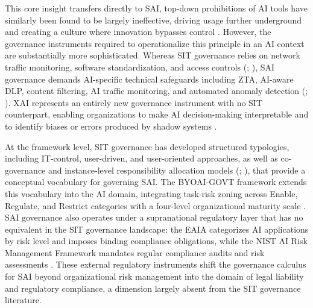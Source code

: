\documentclass[12pt,oneside]{article}
\begin{document}
This core insight transfers directly to \ac{SAI}, top-down prohibitions of \ac{AI} tools have similarly been found to be largely ineffective, driving usage further underground and creating a culture where innovation bypasses control \citep[1136]{raizada2026shadowai}. However, the governance instruments required to operationalize this principle in an \ac{AI} context are substantially more sophisticated. Whereas \ac{SIT} governance relies on network traffic monitoring, software standardization, and access controls (\citealp[278]{silic2014shadow}; \citealp[9]{koch2014consumerization}), \ac{SAI} governance demands \ac{AI}-specific technical safeguards including \ac{ZTA}, \ac{AI}-aware \ac{DLP}, content filtering, \ac{AI} traffic monitoring, and automated anomaly detection (\citealp[973, 974]{puthal2025shadowai}; \citealp[1]{whitford2025aidriven}). \ac{XAI} represents an entirely new governance instrument with no \ac{SIT} counterpart, enabling organizations to make \ac{AI} decision-making interpretable and to identify biases or errors produced by shadow systems \citep[7]{balogun2025ethical}.

At the framework level, \ac{SIT} governance has developed structured typologies, including \ac{IT}-control, user-driven, and user-oriented approaches, as well as co-governance and instance-level responsibility allocation models (\citealp[8-9]{gyoery2012exploring}; \citealp[30]{klotz2019causing}), that provide a conceptual vocabulary for governing \ac{SAI}. The \ac{BYOAI}-GOVT framework extends this vocabulary into the \ac{AI} domain, integrating task-risk zoning across Enable, Regulate, and Restrict categories with a four-level organizational maturity scale \citep[2693]{anthuvan2025byoai}. \ac{SAI} governance also operates under a supranational regulatory layer that has no equivalent in the \ac{SIT} governance landscape: the \ac{EAIA} categorizes \ac{AI} applications by risk level and imposes binding compliance obligations, while the \ac{NIST} \ac{AI} Risk Management Framework mandates regular compliance audits and risk assessments \citep[7]{balogun2025ethical}. These external regulatory instruments shift the governance calculus for \ac{SAI} beyond organizational risk management into the domain of legal liability and regulatory compliance, a dimension largely absent from the \ac{SIT} governance literature.
\end{document}
